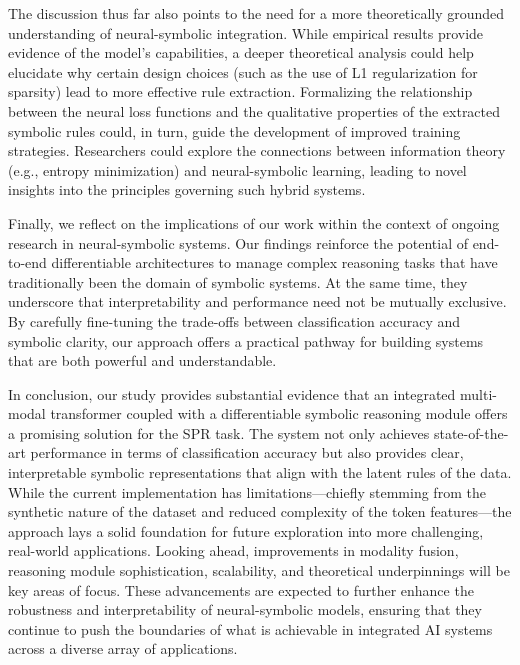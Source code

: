 \documentclass{article}
\begin{document}
The discussion thus far also points to the need for a more theoretically grounded understanding of neural-symbolic integration. While empirical results provide evidence of the model’s capabilities, a deeper theoretical analysis could help elucidate why certain design choices (such as the use of L1 regularization for sparsity) lead to more effective rule extraction. Formalizing the relationship between the neural loss functions and the qualitative properties of the extracted symbolic rules could, in turn, guide the development of improved training strategies. Researchers could explore the connections between information theory (e.g., entropy minimization) and neural-symbolic learning, leading to novel insights into the principles governing such hybrid systems.

Finally, we reflect on the implications of our work within the context of ongoing research in neural-symbolic systems. Our findings reinforce the potential of end-to-end differentiable architectures to manage complex reasoning tasks that have traditionally been the domain of symbolic systems. At the same time, they underscore that interpretability and performance need not be mutually exclusive. By carefully fine-tuning the trade-offs between classification accuracy and symbolic clarity, our approach offers a practical pathway for building systems that are both powerful and understandable.

In conclusion, our study provides substantial evidence that an integrated multi-modal transformer coupled with a differentiable symbolic reasoning module offers a promising solution for the SPR task. The system not only achieves state-of-the-art performance in terms of classification accuracy but also provides clear, interpretable symbolic representations that align with the latent rules of the data. While the current implementation has limitations—chiefly stemming from the synthetic nature of the dataset and reduced complexity of the token features—the approach lays a solid foundation for future exploration into more challenging, real-world applications. Looking ahead, improvements in modality fusion, reasoning module sophistication, scalability, and theoretical underpinnings will be key areas of focus. These advancements are expected to further enhance the robustness and interpretability of neural-symbolic models, ensuring that they continue to push the boundaries of what is achievable in integrated AI systems across a diverse array of applications.
\end{document}
